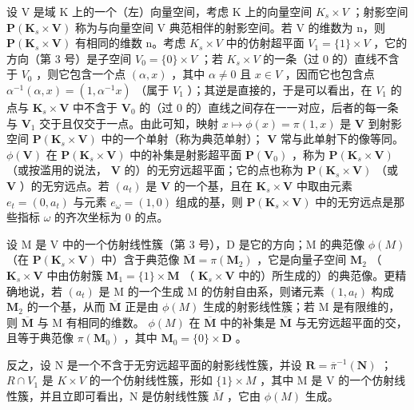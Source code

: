 设 V 是域 K 上的一个（左）向量空间，考虑 K 上的向量空间 \(K_{s} \times V\) ；射影空间 \(\mathbf{P}(\mathbf{K}_{s} \times \mathbf{V})\) 称为与向量空间 V 典范相伴的射影空间。若 V 的维数为 n，则 \(\mathbf{P}(\mathbf{K}_{s} \times \mathbf{V})\) 有相同的维数 n。考虑 \(K_{s} \times V\) 中的仿射超平面 \(V_{1} = \{1\} \times V\) ，它的方向（第 3 号）是子空间 \(V_{0} = \{0\} \times V\) ；若 \(K_{s} \times V\) 的一条（过 0 的）直线不含于 \(V_{0}\) ，则它包含一个点 \((\alpha, x)\) ，其中 \(\alpha \neq 0\) 且 \(x \in V\) ，因而它也包含点 \(\alpha^{-1}(\alpha, x) = (1, \alpha^{-1}x)\) （属于 \(V_{1}\) ）；其逆是直接的，于是可以看出，在 \(V_{1}\) 的点与 \(\mathbf{K}_s \times \mathbf{V}\) 中不含于 \(\mathbf{V}_0\) 的（过 0 的）直线之间存在一一对应，后者的每一条与 \(\mathbf{V}_1\) 交于且仅交于一点。由此可知，映射 \(x \mapsto \phi(x) = \pi(1, x)\) 是 \(\mathbf{V}\) 到射影空间 \(\mathbf{P}(\mathbf{K}_s \times \mathbf{V})\) 中的一个单射（称为典范单射）； \(\mathbf{V}\) 常与此单射下的像等同。 \(\phi(\mathbf{V})\) 在 \(\mathbf{P}(\mathbf{K}_s \times \mathbf{V})\) 中的补集是射影超平面 \(\mathbf{P}(\mathbf{V}_0)\) ，称为 \(\mathbf{P}(\mathbf{K}_s \times \mathbf{V})\) （或按滥用的说法， \(\mathbf{V}\) 的）的无穷远超平面；它的点也称为 \(\mathbf{P}(\mathbf{K}_s \times \mathbf{V})\) （或 \(\mathbf{V}\) ）的无穷远点。若 \((a_t)\) 是 \(\mathbf{V}\) 的一个基，且在 \(\mathbf{K}_s \times \mathbf{V}\) 中取由元素 \(e_t = (0, a_t)\) 与元素 \(e_\omega = (1, 0)\) 组成的基，则 \(\mathbf{P}(\mathbf{K}_s \times \mathbf{V})\) 中的无穷远点是那些指标 \(\omega\) 的齐次坐标为 0 的点。

设 M 是 V 中的一个仿射线性簇（第 3 号），D 是它的方向；M 的典范像 \(\phi(M)\) （在 \(\mathbf{P}(\mathbf{K}_s \times \mathbf{V})\) 中）含于典范像 \(\overline{\mathbf{M}} = \pi(\mathbf{M}_2)\) ，它是向量子空间 \(\mathbf{M}_2\) （ \(\mathbf{K}_s \times \mathbf{V}\) 中由仿射簇 \(\mathbf{M}_1 = \{1\} \times \mathbf{M}\) （ \(\mathbf{K}_s \times \mathbf{V}\) 中的）所生成的）的典范像。更精确地说，若 \((a_t)\) 是 M 的一个生成 M 的仿射自由系，则诸元素 \((1, a_t)\) 构成 \(\mathbf{M}_2\) 的一个基，从而 \(\overline{\mathbf{M}}\) 正是由 \(\phi(M)\) 生成的射影线性簇；若 M 是有限维的，则 \(\overline{\mathbf{M}}\) 与 M 有相同的维数。 \(\phi(M)\) 在 \(\overline{\mathbf{M}}\) 中的补集是 \(\overline{\mathbf{M}}\) 与无穷远超平面的交，且等于典范像 \(\pi(\mathbf{M}_0)\) ，其中 \(\mathbf{M}_0 = \{0\} \times \mathbf{D}\) 。

反之，设 N 是一个不含于无穷远超平面的射影线性簇，并设 \(\mathbf{R} = \overline{\pi}^{-1}(\mathbf{N})\) ； \(R \cap V_{1}\) 是 \(K \times V\) 的一个仿射线性簇，形如 \(\{1\} \times M\) ，其中 M 是 V 的一个仿射线性簇，并且立即可看出，N 是仿射线性簇 \(\overline{M}\) ，它由 \(\phi(M)\) 生成。

